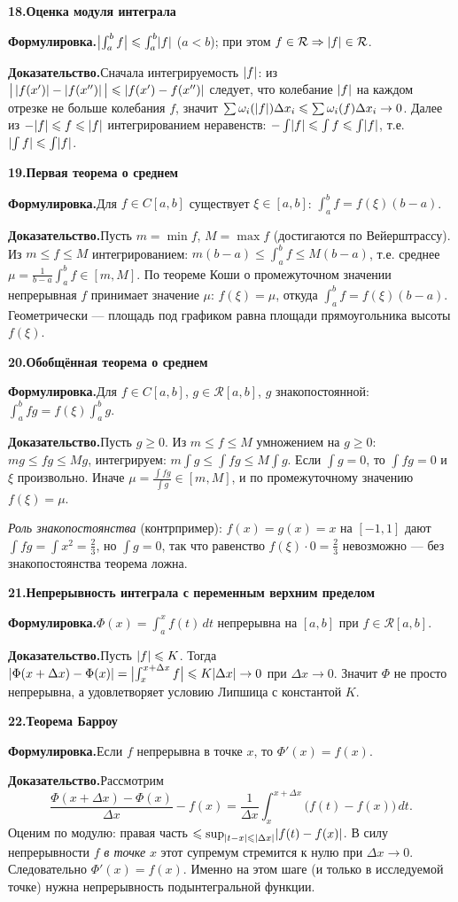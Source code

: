 \documentclass[10pt,a4paper]{article}
\newcommand{\dt}{\,dt}
\renewcommand{\le}{\leqslant}
\renewcommand{\ge}{\geqslant}
\DeclarePairedDelimiter{\abs}{\lvert}{\rvert}
\theoremstyle{definition}
\theoremstyle{plain}
\newcommand{\writespace}{\vspace{7.5mm}}
\newcommand{\prf}[2]{%
  \par\writespace\noindent
  {\large\bfseries\color{accent}#1.\enspace #2}\par\smallskip}
\newcommand{\stmt}{\par\noindent\textbf{Формулировка.}\enspace}
\newcommand{\dok}{\par\noindent\textbf{Доказательство.}\enspace}
\begin{document}
\prf{18}{Оценка модуля интеграла}
\stmt $\abs[\big]{\int_a^b f}\le\int_a^b\abs f$ ($a<b$); при этом $f\in\mathcal R\Rightarrow\abs f\in\mathcal R$.

\dok Сначала интегрируемость $\abs f$: из $\bigl|\,\abs{f(x')}-\abs{f(x'')}\,\bigr|\le\abs{f(x')-f(x'')}$
следует, что колебание $\abs f$ на каждом отрезке не больше колебания $f$, значит
$\sum\omega_i(\abs f)\Delta x_i\le\sum\omega_i(f)\Delta x_i\to0$. Далее из $-\abs f\le f\le\abs f$
интегрированием неравенств: $-\int\abs f\le\int f\le\int\abs f$, т.е. $\abs{\int f}\le\int\abs f$.

\prf{19}{Первая теорема о среднем}
\stmt Для $f\in C[a,b]$ существует $\xi\in[a,b]$: $\int_a^b f=f(\xi)(b-a)$.

\dok Пусть $m=\min f$, $M=\max f$ (достигаются по Вейерштрассу). Из $m\le f\le M$ интегрированием:
$m(b-a)\le\int_a^b f\le M(b-a)$, т.е. среднее $\mu=\tfrac{1}{b-a}\int_a^b f\in[m,M]$. По теореме
Коши о промежуточном значении непрерывная $f$ принимает значение $\mu$: $f(\xi)=\mu$, откуда
$\int_a^b f=f(\xi)(b-a)$. Геометрически — площадь под графиком равна площади прямоугольника высоты
$f(\xi)$.

\prf{20}{Обобщённая теорема о среднем}
\stmt Для $f\in C[a,b]$, $g\in\mathcal R[a,b]$, $g$ знакопостоянной: $\int_a^b fg=f(\xi)\int_a^b g$.

\dok Пусть $g\ge0$. Из $m\le f\le M$ умножением на $g\ge0$: $mg\le fg\le Mg$, интегрируем:
$m\int g\le\int fg\le M\int g$. Если $\int g=0$, то $\int fg=0$ и $\xi$ произвольно. Иначе
$\mu=\tfrac{\int fg}{\int g}\in[m,M]$, и по промежуточному значению $f(\xi)=\mu$.

\emph{Роль знакопостоянства} (контрпример): $f(x)=g(x)=x$ на $[-1,1]$ дают $\int fg=\int x^2=\tfrac23$, но
$\int g=0$, так что равенство $f(\xi)\cdot0=\tfrac23$ невозможно — без знакопостоянства теорема
ложна.

\prf{21}{Непрерывность интеграла с переменным верхним пределом}
\stmt $\Phi(x)=\int_a^x f(t)\dt$ непрерывна на $[a,b]$ при $f\in\mathcal R[a,b]$.

\dok Пусть $\abs f\le K$. Тогда
$\abs{\Phi(x+\Delta x)-\Phi(x)}=\abs[\big]{\int_x^{x+\Delta x}f}\le K\abs{\Delta x}\to0$ при
$\Delta x\to0$. Значит $\Phi$ не просто непрерывна, а удовлетворяет условию Липшица с константой
$K$.

\prf{22}{Теорема Барроу}
\stmt Если $f$ непрерывна в точке $x$, то $\Phi'(x)=f(x)$.

\dok Рассмотрим
\[
  \frac{\Phi(x+\Delta x)-\Phi(x)}{\Delta x}-f(x)
  =\frac1{\Delta x}\int_x^{x+\Delta x}\bigl(f(t)-f(x)\bigr)\dt .
\]
Оценим по модулю: правая часть $\le\sup_{\abs{t-x}\le\abs{\Delta x}}\abs{f(t)-f(x)}$. В силу
непрерывности $f$ \emph{в точке} $x$ этот супремум стремится к нулю при $\Delta x\to0$.
Следовательно $\Phi'(x)=f(x)$. Именно на этом шаге (и только в исследуемой точке) нужна
непрерывность подынтегральной функции.
\end{document}
